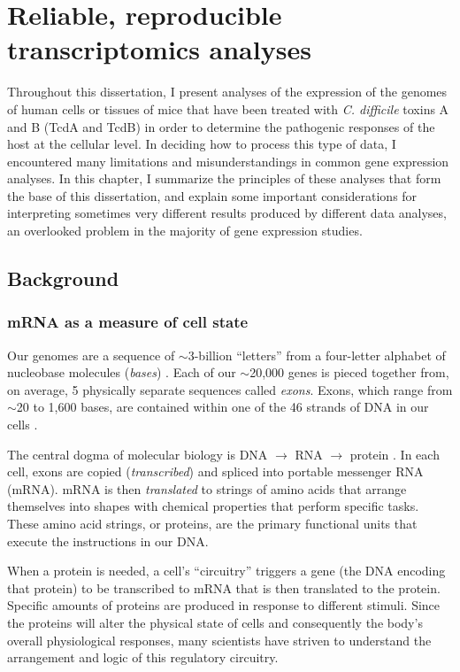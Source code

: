 
\chapter[Choosing transcriptomics analyses]{Reliable, reproducible 
           transcriptomics analyses}\label{chapter:introjtm}

Throughout this dissertation, I present analyses of the expression of the genomes
of human cells or tissues of mice that have been treated 
with \textit{C. difficile} toxins A and B
(TcdA and TcdB) in order to determine the pathogenic responses
of the host at the cellular level. 
In deciding how to process this type of data,
I encountered many limitations and misunderstandings in 
common gene expression analyses. In this chapter, I summarize
the principles of these analyses that form 
the base of this dissertation, and explain some important considerations
for interpreting sometimes very different results 
produced by different data analyses, an overlooked problem in the
majority of gene expression studies.

\section{Background}

\subsection{mRNA as a measure of cell state}

Our genomes are a sequence of $\sim$3-billion ``letters'' from a four-letter
alphabet of nucleobase molecules (\textit{bases}) \cite{Lander:2001wi}. 
Each of our $\sim$20,000 genes is pieced together from, on average,
5 physically separate sequences called \textit{exons}. Exons, which
range from $\sim$20 to 1,600 bases, are contained
within one of the 46 strands of DNA in our cells \cite{Michael:1999dm}.

The central dogma of molecular biology is 
DNA $\rightarrow$ RNA $\rightarrow$ protein \cite{Crick:1970wb}.
In each cell, exons are
copied (\textit{transcribed}) and spliced into portable
messenger RNA (mRNA). 
mRNA is then \textit{translated} to strings
of amino acids that arrange themselves into shapes with 
chemical properties that perform specific tasks.
These amino acid strings, or proteins, are the primary functional 
units that execute the instructions in our DNA.

When a protein is needed, a cell's ``circuitry'' 
triggers a gene (the DNA encoding that protein)
to be transcribed to mRNA that is then translated to the protein.
Specific amounts of proteins are produced
in response to different stimuli. Since the proteins will alter
the physical state of cells and consequently the body's overall physiological responses, 
many scientists have striven to understand the arrangement and logic
of this regulatory circuitry.

